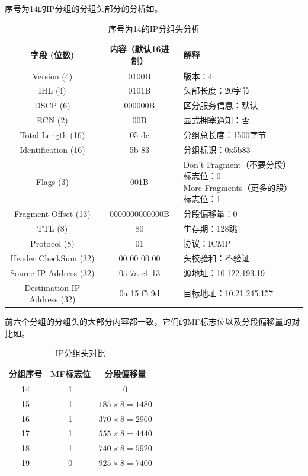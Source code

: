 \documentclass[lang=cn,11pt,a4paper,cite=authornum]{paper}
\begin{document}
序号为14的IP分组的分组头部分的分析如。

\begin{table}[!htbp]
    \centering
    \caption{序号为14的IP分组头分析\label{tab:ip1res}}
    \begin{tabular}{|c|c|l|}
        \hline
        字段 (位数) & 内容（默认16进制） & 解释 \\
        \hline
        Version (4) & 0100B & 版本：4 \\
        \hline
        IHL (4) & 0101B & 头部长度：20字节 \\
        \hline
        DSCP (6) & 000000B & 区分服务信息：默认 \\
        \hline
        ECN (2) & 00B & 显式拥塞通知：否 \\
        \hline
        Total Length (16) & 05 dc & 分组总长度：1500字节 \\
        \hline
        Identification (16) & 5b 83 & 分组标识：0x5b83 \\
        \hline
        Flags (3) & 001B & \makecell[l]{Don't Fragment（不要分段）标志位：0 \\ More Fragments（更多的段）标志位：1} \\
        \hline
        Fragment Offset (13) & 0000000000000B & 分段偏移量：0 \\
        \hline
        TTL (8) & 80 & 生存期：128跳 \\
        \hline
        Protocol (8) & 01 & 协议：ICMP \\
        \hline
        Header CheckSum (32) & 00 00 00 00 & 头校验和：不验证 \\
        \hline
        Source IP Address (32) & 0a 7a c1 13 & 源地址：10.122.193.19 \\
        \hline
        Destimation IP Address (32) & 0a 15 f5 9d & 目标地址：10.21.245.157 \\
        \hline
    \end{tabular}
\end{table}

前六个分组的分组头的大部分内容都一致，它们的MF标志位以及分段偏移量的对比如。

\begin{table}[!htbp]
    \centering
    \caption{IP分组头对比\label{tab:ipcomp}}
    \begin{tabular}{|c|c|c|}
        \hline
        分组序号 & MF标志位 & 分段偏移量 \\
        \hline
        14 & 1 & 0 \\
        \hline
        15 & 1 & $185\times8=1480$ \\
        \hline
        16 & 1 & $370\times8=2960$ \\
        \hline
        17 & 1 & $555\times8=4440$ \\
        \hline
        18 & 1 & $740\times8=5920$ \\
        \hline
        19 & 0 & $925\times8=7400$ \\
        \hline
    \end{tabular}
\end{table}
\end{document}
